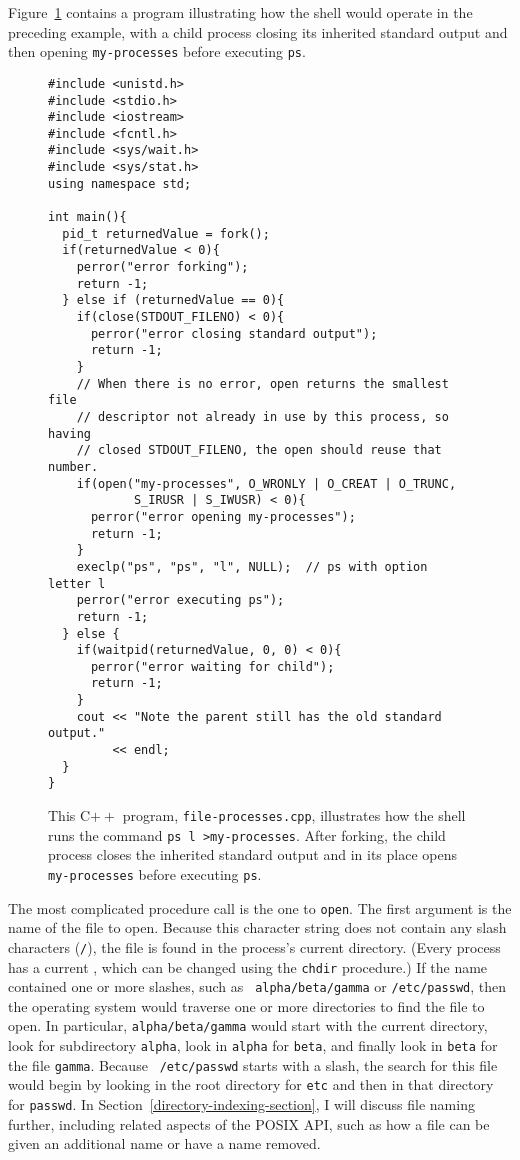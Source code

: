 Figure~\ref{file-processes-source} contains a program illustrating how
the shell would operate in the preceding example, with a child process
closing its inherited standard output and then opening \verb|my-processes| before executing \verb|ps|.
\begin{figure}
\begin{verbatim}
#include <unistd.h>
#include <stdio.h>
#include <iostream>
#include <fcntl.h>
#include <sys/wait.h>
#include <sys/stat.h>
using namespace std;

int main(){
  pid_t returnedValue = fork();
  if(returnedValue < 0){
    perror("error forking");
    return -1;
  } else if (returnedValue == 0){
    if(close(STDOUT_FILENO) < 0){
      perror("error closing standard output");
      return -1;
    }
    // When there is no error, open returns the smallest file
    // descriptor not already in use by this process, so having
    // closed STDOUT_FILENO, the open should reuse that number.
    if(open("my-processes", O_WRONLY | O_CREAT | O_TRUNC,
            S_IRUSR | S_IWUSR) < 0){
      perror("error opening my-processes");
      return -1;
    }
    execlp("ps", "ps", "l", NULL);  // ps with option letter l
    perror("error executing ps");
    return -1;
  } else {
    if(waitpid(returnedValue, 0, 0) < 0){
      perror("error waiting for child");
      return -1;
    }
    cout << "Note the parent still has the old standard output."
         << endl;
  }
}
\end{verbatim}
\caption{This C$++$ program, {\tt file-processes.cpp}, illustrates how
  the shell runs the command {\tt ps l >my-processes}.  After
  forking, the child process closes the inherited standard output and
  in its place opens {\tt my-processes} before executing {\tt ps}.}
\label{file-processes-source}
\end{figure}
The most complicated procedure call is the one to \verb|open|.  The
first argument is the name of the file to open.  Because this
character string does not contain any slash characters ({\tt /}), the
file is found in the process's current directory.  (Every process has a
current , which can be changed using the \verb|chdir|
procedure.)  If the name contained one or more slashes, such as {\tt
alpha/beta/gamma} or {\tt /etc/passwd}, then the operating system would
traverse one or more directories to find the file to open.  In particular,
{\tt alpha/beta/gamma} would start with the current directory, look for
subdirectory {\tt alpha}, look in {\tt alpha} for {\tt beta},
and finally look in {\tt beta} for the file {\tt gamma}.  Because {\tt
/etc/passwd} starts with a slash, the search for this file would begin
by looking in the root directory for {\tt etc} and then in that directory
for {\tt passwd}. In
Section~\ref{directory-indexing-section}, I will discuss file naming
further, including related aspects of the POSIX API, such as how a
file can be given an additional name or have a name removed.


